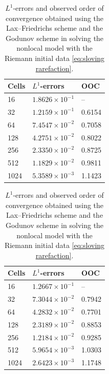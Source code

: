 \begin{table}[H]
    \centering
    \begin{minipage}{0.45\textwidth}
        \centering
        \begin{tabular}{ |p{1.5cm}||p{2.2cm}| |p{1.5cm}| }
            \hline
            \textbf{Cells } & $L^{1}$-\textbf{errors}  & \textbf{OOC} \\
            \hline
            16              & $1.8626 \times 10^{-1}$  & --           \\
            32              & $1.2159 \times 10^{-1}$  & 0.6154       \\
            64              & $7.4547 \times 10^{-2}$  & 0.7058       \\
            128             & $ 4.2751 \times 10^{-2}$ & 0.8022       \\
            256             & $2.3350 \times 10^{-2}$  & 0.8725       \\
            512             & $1.1829 \times 10^{-2}$  & 0.9811       \\
            1024            & $5.3589 \times 10^{-3}$  & 1.1423       \\
            \hline
        \end{tabular}
        \caption*{(a) Lax--Friedrichs scheme}
    \end{minipage}
    \hfill
    \begin{minipage}{0.5\textwidth}
        \centering
        \begin{tabular}{ |p{1.5cm}||p{2.2cm}| |p{1.5cm}| }
            \hline
            \textbf{Cells } & $L^{1}$-\textbf{errors}  & \textbf{OOC} \\
            \hline
            16              & $1.2667 \times 10^{-1}$  & --           \\
            32              & $ 7.3044 \times 10^{-2}$ & 0.7942       \\
            64              & $4.2832 \times 10^{-2}$  & 0.7701       \\
            128             & $2.3189 \times 10^{-2}$  & 0.8853       \\
            256             & $1.2184 \times 10^{-2}$  & 0.9285       \\
            512             & $5.9654 \times 10^{-3}$  & 1.0303       \\
            1024            & $ 2.6423 \times 10^{-3}$ & 1.1748       \\
            \hline
        \end{tabular}
        \caption*{(b) Godunov scheme}
    \end{minipage}

    \caption{$L^{1}$-errors and observed order of convergence obtained using the Lax--Friedrichs scheme and the Godunov scheme in solving the nonlocal model with the Riemann initial data \eqref{eq:sloving rarefaction}.}
    \label{tab:table_4}
\end{table}

